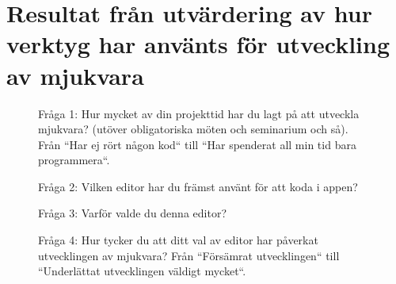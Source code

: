 \pagebreak

\chapter{\hspace{2.6em} Resultat från utvärdering av hur verktyg har använts för utveckling av mjukvara}
\label{cha:verktyg_enkat_resultat}

\begin{figure}[!h]
	\centering
	\caption{Fråga 1: Hur mycket av din projekttid har du lagt på att utveckla mjukvara? (utöver obligatoriska möten och seminarium och så). Från ``Har ej rört någon kod`` till ``Har spenderat all min tid bara programmera``.}
\end{figure}

\begin{figure}[!h]
	\centering
	\caption{Fråga 2: Vilken editor har du främst använt för att koda i appen?}
\end{figure}

\begin{figure}[!h]
	\centering
	\caption{Fråga 3: Varför valde du denna editor?}
\end{figure}

\begin{figure}[!h]
	\centering
	\caption{Fråga 4: Hur tycker du att ditt val av editor har påverkat utvecklingen av mjukvara? Från ``Försämrat utvecklingen`` till ``Underlättat utvecklingen väldigt mycket``.}
\end{figure}


